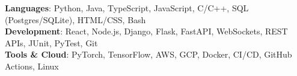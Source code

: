 \begin{itemize}[leftmargin=0.15in, label={}]
    \small{\item{
     \textbf{Languages}{: Python, Java, TypeScript, JavaScript, C/C++, SQL (Postgres/SQLite), HTML/CSS, Bash} \\
     \textbf{Development}{: React, Node.js, Django, Flask, FastAPI, WebSockets, REST APIs, JUnit, PyTest, Git} \\
     \textbf{Tools \& Cloud}{: PyTorch, TensorFlow, AWS, GCP, Docker, CI/CD, GitHub Actions, Linux}
    }}
\end{itemize}
